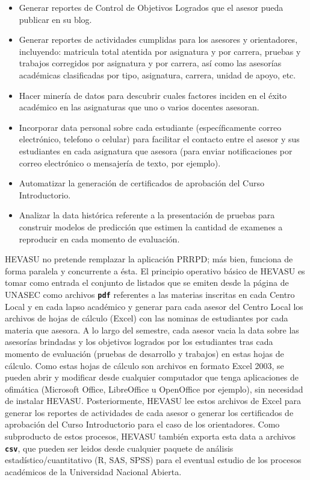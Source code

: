 \documentclass[letterpaper,12pt]{book}
\newcommand{\fileformat}[1]{\textbf{\texttt{#1}}}
\begin{document}
\begin{itemize}
	\item Generar reportes de Control de Objetivos Logrados que el asesor pueda publicar en su blog.
	\item Generar reportes de actividades cumplidas para los asesores y orientadores, incluyendo: matricula total atentida por asignatura y por carrera, pruebas y trabajos corregidos por asignatura y por carrera, así como las asesorías académicas clasificadas por tipo, asignatura, carrera, unidad de apoyo, etc.
	\item Hacer minería de datos para descubrir cuales factores inciden en el éxito académico en las asignaturas que uno o varios docentes asesoran.
	\item Incorporar data personal sobre cada estudiante (específicamente correo elec\-trónico, telefono o celular) para facilitar el contacto entre el asesor y sus estudiantes en cada asignatura que asesora (para enviar notificaciones por correo electrónico o mensajería de texto, por ejemplo).
	\item Automatizar la generación de certificados de aprobación del Curso Introductorio.
	\item Analizar la data histórica referente a la presentación de pruebas para construir modelos de predicción que estimen la cantidad de examenes a reproducir en cada momento de evaluación.
\end{itemize}

HEVASU no pretende remplazar la aplicación PRRPD; más bien, funciona de forma paralela y concurrente a ésta. El principio operativo básico de HEVASU es tomar como entrada el conjunto de listados que se emiten desde la página de UNASEC como archivos \fileformat{pdf} referentes a las materias inscritas en cada Centro Local y en cada lapso académico y generar para cada asesor del Centro Local los archivos de hojas de cálculo (Excel) con las nominas de estudiantes por cada materia que asesora.  A lo largo del semestre, cada asesor vacia la data sobre las asesorías brindadas y los objetivos logrados por los estudiantes tras cada momento de evaluación (pruebas de desarrollo y trabajos) en estas hojas de cálculo. Como estas hojas de cálculo son archivos en formato Excel 2003, se pueden abrir y modificar desde cualquier computador que tenga aplicaciones de ofimática (Microsoft Office, LibreOffice u OpenOffice por ejemplo), sin necesidad de instalar HEVASU. Posteriormente, HEVASU lee estos archivos de Excel para generar los reportes de actividades de cada asesor o generar los certificados de aprobación del Curso Introductorio para el caso de los orientadores. Como subproducto de estos procesos, HEVASU también exporta esta data a archivos \fileformat{csv}, que pueden ser leidos desde cualquier paquete de análisis estadístico/cuantitativo (R, SAS, SPSS) para el eventual estudio de los procesos académicos de la Universidad Nacional Abierta.
\end{document}
